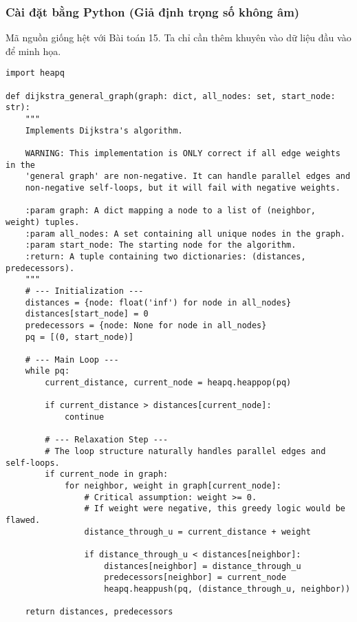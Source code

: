 \documentclass[a4paper,12pt]{article}
\begin{document}
\subsubsection{Cài đặt bằng Python (Giả định trọng số không âm)}
Mã nguồn giống hệt với Bài toán 15. Ta chỉ cần thêm khuyên vào dữ liệu đầu vào để minh họa.
\begin{lstlisting}[style=pythonstyle, caption={Cài đặt Dijkstra cho đồ thị tổng quát (chỉ trọng số không âm).}, label={lst:python_16}]
import heapq

def dijkstra_general_graph(graph: dict, all_nodes: set, start_node: str):
    """
    Implements Dijkstra's algorithm.

    WARNING: This implementation is ONLY correct if all edge weights in the
    'general graph' are non-negative. It can handle parallel edges and
    non-negative self-loops, but it will fail with negative weights.

    :param graph: A dict mapping a node to a list of (neighbor, weight) tuples.
    :param all_nodes: A set containing all unique nodes in the graph.
    :param start_node: The starting node for the algorithm.
    :return: A tuple containing two dictionaries: (distances, predecessors).
    """
    # --- Initialization ---
    distances = {node: float('inf') for node in all_nodes}
    distances[start_node] = 0
    predecessors = {node: None for node in all_nodes}
    pq = [(0, start_node)]

    # --- Main Loop ---
    while pq:
        current_distance, current_node = heapq.heappop(pq)
        
        if current_distance > distances[current_node]:
            continue
            
        # --- Relaxation Step ---
        # The loop structure naturally handles parallel edges and self-loops.
        if current_node in graph:
            for neighbor, weight in graph[current_node]:
                # Critical assumption: weight >= 0.
                # If weight were negative, this greedy logic would be flawed.
                distance_through_u = current_distance + weight
                
                if distance_through_u < distances[neighbor]:
                    distances[neighbor] = distance_through_u
                    predecessors[neighbor] = current_node
                    heapq.heappush(pq, (distance_through_u, neighbor))
                
    return distances, predecessors


\end{lstlisting}
\end{document}
